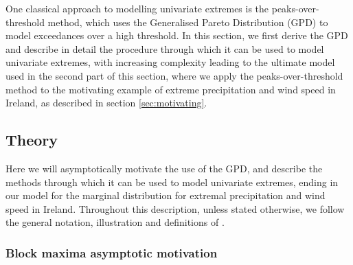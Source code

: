 \documentclass{article}
\numberwithin{equation}{section}
\begin{document}

One classical approach to modelling univariate extremes is the peaks-over-threshold method, which uses the Generalised Pareto Distribution (GPD) to model exceedances over a high threshold.
In this section, we first derive the GPD and describe in detail the procedure through which it can be used to model univariate extremes, with increasing complexity leading to the ultimate model used in the second part of this section, where we apply the peaks-over-threshold method to the motivating example of extreme precipitation and wind speed in Ireland, as described in section \ref{sec:motivating}.


\subsection{Theory}

Here we will asymptotically motivate the use of the GPD, and describe the methods through which it can be used to model univariate extremes, ending in our model for the marginal distribution for extremal precipitation and wind speed in Ireland.
Throughout this description, unless stated otherwise, we follow the general notation, illustration and definitions of \cite{Coles2001}.

\subsubsection{Block maxima asymptotic motivation} \label{subsubsec:asymptotic}

\end{document}
